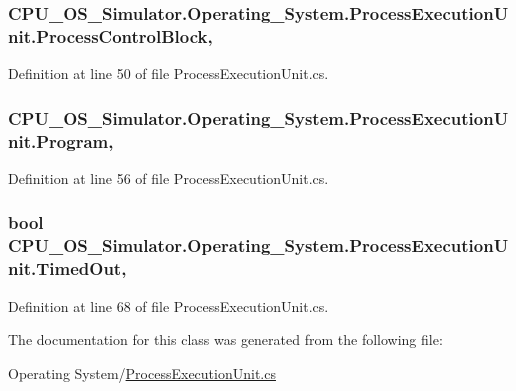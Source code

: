 \subsubsection[{Process\+Control\+Block}]{ C\+P\+U\+\_\+\+O\+S\+\_\+\+Simulator.\+Operating\+\_\+\+System.\+Process\+Execution\+Unit.\+Process\+Control\+Block\hspace{0.3cm}{\ttfamily [get]}, {\ttfamily [set]}}\label{class_c_p_u___o_s___simulator_1_1_operating___system_1_1_process_execution_unit_a50dccf62e2bc43d1ad30f6488d3ffa58}


Definition at line 50 of file Process\+Execution\+Unit.\+cs.

\hypertarget{class_c_p_u___o_s___simulator_1_1_operating___system_1_1_process_execution_unit_a4a065d00dc99f2874bbfacbec4ff2b8c}{}
\subsubsection[{Program}]{ C\+P\+U\+\_\+\+O\+S\+\_\+\+Simulator.\+Operating\+\_\+\+System.\+Process\+Execution\+Unit.\+Program\hspace{0.3cm}{\ttfamily [get]}, {\ttfamily [set]}}\label{class_c_p_u___o_s___simulator_1_1_operating___system_1_1_process_execution_unit_a4a065d00dc99f2874bbfacbec4ff2b8c}


Definition at line 56 of file Process\+Execution\+Unit.\+cs.

\hypertarget{class_c_p_u___o_s___simulator_1_1_operating___system_1_1_process_execution_unit_aa507b44c8134ffd0e9fbe702e1bf9e32}{}
\subsubsection[{Timed\+Out}]{\setlength{\rightskip}{0pt plus 5cm}bool C\+P\+U\+\_\+\+O\+S\+\_\+\+Simulator.\+Operating\+\_\+\+System.\+Process\+Execution\+Unit.\+Timed\+Out\hspace{0.3cm}{\ttfamily [get]}, {\ttfamily [set]}}\label{class_c_p_u___o_s___simulator_1_1_operating___system_1_1_process_execution_unit_aa507b44c8134ffd0e9fbe702e1bf9e32}


Definition at line 68 of file Process\+Execution\+Unit.\+cs.



The documentation for this class was generated from the following file\+:\begin{DoxyCompactItemize}
\item 
Operating System/\hyperlink{_process_execution_unit_8cs}{Process\+Execution\+Unit.\+cs}\end{DoxyCompactItemize}
